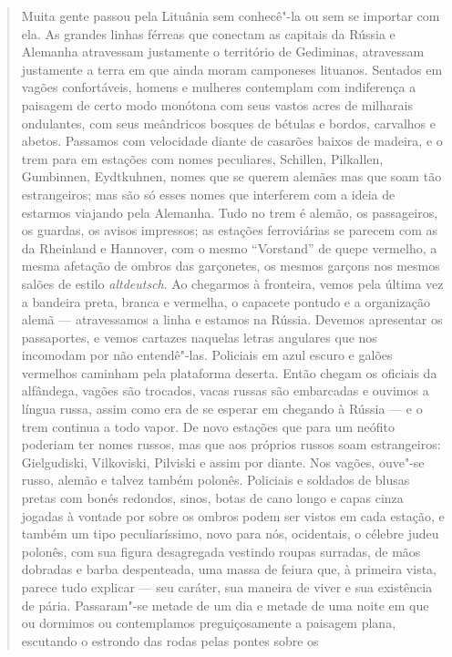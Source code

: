 %

\begin{quote}
Muita gente passou pela Lituânia sem conhecê"-la ou sem se importar com
ela. As grandes linhas férreas que conectam as capitais da Rússia e
Alemanha atravessam justamente o território de Gediminas, atravessam
justamente a terra em que ainda moram camponeses lituanos. Sentados em
vagões confortáveis, homens e mulheres contemplam com indiferença a
paisagem de certo modo monótona com seus vastos acres de milharais
ondulantes, com seus meândricos bosques de bétulas e bordos, carvalhos e
abetos. Passamos com velocidade diante de casarões baixos de madeira, e
o trem para em estações com nomes peculiares, Schillen, Pilkallen,
Gumbinnen, Eydtkuhnen, nomes que se querem alemães mas que soam tão
estrangeiros; mas são só esses nomes que interferem com a ideia de
estarmos viajando pela Alemanha. Tudo no trem é alemão, os passageiros,
os guardas, os avisos impressos; as estações ferroviárias se parecem com
as da Rheinland e Hannover, com o mesmo ``Vorstand'' de quepe vermelho,
a mesma afetação de ombros das garçonetes, os mesmos garçons nos mesmos
salões de estilo \textit{altdeutsch}. Ao chegarmos à fronteira, vemos pela
última vez a bandeira preta, branca e vermelha, o capacete pontudo e a
organização alemã --- atravessamos a linha e estamos na Rússia. Devemos
apresentar os passaportes, e vemos cartazes naquelas letras angulares
que nos incomodam por não entendê"-las. Policiais em azul escuro e galões
vermelhos caminham pela plataforma deserta. Então chegam os oficiais da
alfândega, vagões são trocados, vacas russas são embarcadas e ouvimos a
língua russa, assim como era de se esperar em chegando à Rússia --- e o
trem continua a todo vapor. De novo estações que para um neófito
poderiam ter nomes russos, mas que aos próprios russos soam
estrangeiros: Gielgudiski, Vilkoviski, Pilviski e assim por diante. Nos
vagões, ouve"-se russo, alemão e talvez também polonês. Policiais e
soldados de blusas pretas com bonés redondos, sinos, botas de cano longo
e capas cinza jogadas à vontade por sobre os ombros podem ser vistos em
cada estação, e também um tipo peculiaríssimo, novo para nós,
ocidentais, o célebre judeu polonês, com sua figura desagregada vestindo
roupas surradas, de mãos dobradas e barba despenteada, uma massa de
feiura que, à primeira vista, parece tudo explicar --- seu caráter, sua
maneira de viver e sua existência de pária. Passaram"-se metade de um dia
e metade de uma noite em que ou dormimos ou contemplamos preguiçosamente
a paisagem plana, escutando o estrondo das rodas pelas pontes sobre os

\end{quote}
